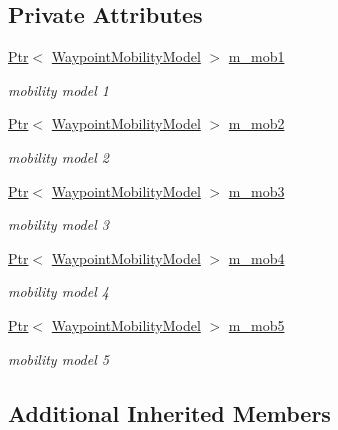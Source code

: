 \subsection*{Private Attributes}
\begin{DoxyCompactItemize}
\item 
\hyperlink{classns3_1_1Ptr}{Ptr}$<$ \hyperlink{classns3_1_1WaypointMobilityModel}{Waypoint\+Mobility\+Model} $>$ \hyperlink{classWaypointInitialPositionIsWaypoint_a9b93ba0b150329a715f03d1e9d17c38f}{m\+\_\+mob1}
\begin{DoxyCompactList}\small\item\em mobility model 1 \end{DoxyCompactList}\item 
\hyperlink{classns3_1_1Ptr}{Ptr}$<$ \hyperlink{classns3_1_1WaypointMobilityModel}{Waypoint\+Mobility\+Model} $>$ \hyperlink{classWaypointInitialPositionIsWaypoint_a7900aaed6cf7a4022808b6905d6d71c1}{m\+\_\+mob2}
\begin{DoxyCompactList}\small\item\em mobility model 2 \end{DoxyCompactList}\item 
\hyperlink{classns3_1_1Ptr}{Ptr}$<$ \hyperlink{classns3_1_1WaypointMobilityModel}{Waypoint\+Mobility\+Model} $>$ \hyperlink{classWaypointInitialPositionIsWaypoint_ae5d635a7eddf81f70c712ad7a20de402}{m\+\_\+mob3}
\begin{DoxyCompactList}\small\item\em mobility model 3 \end{DoxyCompactList}\item 
\hyperlink{classns3_1_1Ptr}{Ptr}$<$ \hyperlink{classns3_1_1WaypointMobilityModel}{Waypoint\+Mobility\+Model} $>$ \hyperlink{classWaypointInitialPositionIsWaypoint_a314ea7cc7f3a519067fb64153e6f3e2f}{m\+\_\+mob4}
\begin{DoxyCompactList}\small\item\em mobility model 4 \end{DoxyCompactList}\item 
\hyperlink{classns3_1_1Ptr}{Ptr}$<$ \hyperlink{classns3_1_1WaypointMobilityModel}{Waypoint\+Mobility\+Model} $>$ \hyperlink{classWaypointInitialPositionIsWaypoint_a450fe8fc533ad5fe8a6940f21b148f5f}{m\+\_\+mob5}
\begin{DoxyCompactList}\small\item\em mobility model 5 \end{DoxyCompactList}\end{DoxyCompactItemize}
\subsection*{Additional Inherited Members}


